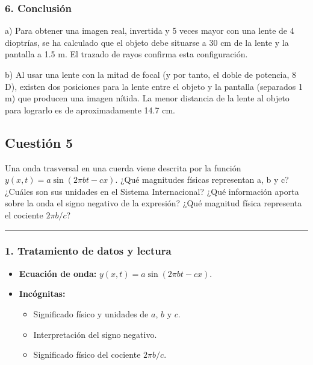 \subsubsection*{6. Conclusión}
\begin{cajaconclusion}
a) Para obtener una imagen real, invertida y 5 veces mayor con una lente de 4 dioptrías, se ha calculado que el objeto debe situarse a 30 cm de la lente y la pantalla a 1.5 m. El trazado de rayos confirma esta configuración.

b) Al usar una lente con la mitad de focal (y por tanto, el doble de potencia, 8 D), existen dos posiciones para la lente entre el objeto y la pantalla (separados 1 m) que producen una imagen nítida. La menor distancia de la lente al objeto para lograrlo es de aproximadamente 14.7 cm.
\end{cajaconclusion}

\newpage
\subsection{Cuestión 5}
\label{subsec:C5_2022_jul_ord}

\begin{cajaenunciado}
Una onda trasversal en una cuerda viene descrita por la función $y(x,t)=a\sin(2\pi bt-cx)$. ¿Qué magnitudes físicas representan a, b y c? ¿Cuáles son sus unidades en el Sistema Internacional? ¿Qué información aporta sobre la onda el signo negativo de la expresión? ¿Qué magnitud física representa el cociente $2\pi b/c$?
\end{cajaenunciado}
\hrule

\subsubsection*{1. Tratamiento de datos y lectura}
\begin{itemize}
    \item \textbf{Ecuación de onda:} $y(x,t)=a\sin(2\pi bt-cx)$.
    \item \textbf{Incógnitas:}
    \begin{itemize}
        \item Significado físico y unidades de $a$, $b$ y $c$.
        \item Interpretación del signo negativo.
        \item Significado físico del cociente $2\pi b/c$.
    \end{itemize}
\end{itemize}

